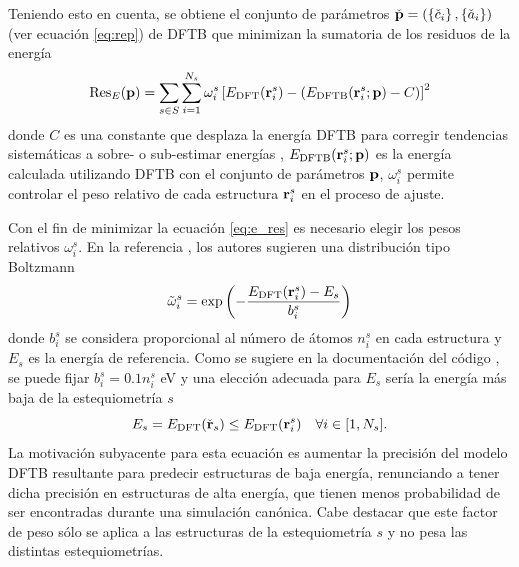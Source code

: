 Teniendo esto en cuenta, se obtiene el conjunto de parámetros 
$\check{\bf p} = \left( \left\{\check{c}_i\right\}, \left\{\check{a}_i\right\}\right)$ 
(ver ecuación \ref{eq:rep}) de DFTB que minimizan la sumatoria de los residuos 
de la energía
\begin{equation}\label{eq:e_res}
    \text{Res}_E({\bf p})=\sum_{s\in S}\sum_{i=1}^{N_s} \omega^s_i
    \left[E_{\text{DFT}}({\bf r}^s_i)-(E_{\text{DFTB}}({\bf r}^s_i;{\bf p})-C)\right]^2
\end{equation}
donde $C$ es una constante que desplaza la energía DFTB para corregir tendencias
sistemáticas a sobre- o sub-estimar energías \cite{van2018, van2019}, 
$E_{\text{DFTB}}({\bf r}^s_i;{\bf p})$ es la energía calculada utilizando DFTB con 
el conjunto de parámetros ${\bf p}$, $\omega_i^s$ permite controlar el peso 
relativo de cada estructura ${\bf r}^s_i$ en el proceso de ajuste.

Con el fin de minimizar la ecuación \ref{eq:e_res} es necesario elegir los pesos 
relativos $\omega_i^s$. En la referencia \cite{van2019}, los autores sugieren una 
distribución tipo Boltzmann
\begin{equation}\label{eq:omega}
    \tilde\omega^s_i=\exp\left(-\frac{E_\text{DFT}({\bf r}^s_i)-E_s}{b^s_i}\right)
\end{equation}
donde $b^s_i$ se considera proporcional al número de átomos $n^s_i$ en cada 
estructura y $E_s$ es la energía de referencia. Como se sugiere en la
documentación del código  \cite{tango}, se puede fijar 
$b^s_i = 0.1 n^s_i$ eV y una elección adecuada para $E_s$ sería la energía más 
baja de la estequiometría $s$
\begin{equation}\label{eq:e_s}
  E_s=E_\text{DFT}(\check{{\bf r}}_s) \leq E_\text{DFT}({\bf r}^s_i) \quad \forall i \in [1,N_s].
\end{equation}
La motivación subyacente para esta ecuación es aumentar la precisión del modelo 
DFTB resultante para predecir estructuras de baja energía, renunciando a tener 
dicha precisión en estructuras de alta energía, que tienen menos probabilidad 
de ser encontradas durante una simulación canónica. Cabe destacar que este factor
de peso sólo se aplica a las estructuras de la estequiometría $s$ y no pesa las 
distintas estequiometrías.

